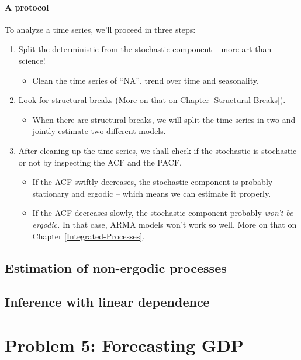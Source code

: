 \documentclass[11pt, a4paper]{report}
\theoremstyle{plain}
\theoremstyle{plain}
\theoremstyle{remark}
\begin{document}
\subsubsection{A protocol}

To analyze a time series, we'll proceed in three steps:
\begin{enumerate}
	\item Split the deterministic from the stochastic component -- more art than science! \begin{itemize}
		\item Clean the time series of ``NA'', trend over time and seasonality.
	\end{itemize}
	\item Look for structural breaks (More on that on Chapter \ref{Structural-Breaks}). \begin{itemize}
		\item When there are structural breaks, we will split the time series in two and jointly estimate two different models.
	\end{itemize}
	\item After cleaning up the time series, we shall check if the stochastic is stochastic or not by inspecting the ACF and the PACF. 
	\begin{itemize}
		\item If the ACF swiftly decreases, the stochastic component is probably stationary and ergodic -- which means we can estimate it properly.
		\item If the ACF decreases slowly, the stochastic component probably \textit{won't be ergodic.} In that case, ARMA models won't work so well. More on that on Chapter \ref{Integrated-Processes}.
	\end{itemize}
\end{enumerate}


\section{Estimation of non-ergodic processes} %


\section{Inference with linear dependence} %



\chapter{Problem 5: Forecasting GDP}
\end{document}
